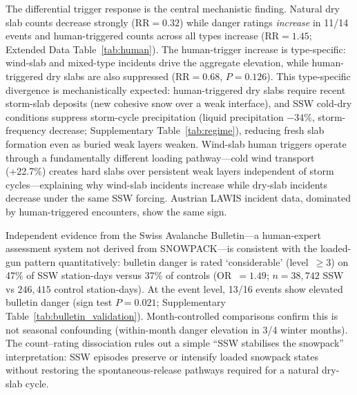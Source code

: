 \documentclass[11pt,letterpaper]{article}
\begin{document}
The differential trigger response is the central mechanistic finding. Natural dry slab counts decrease strongly ($\mathrm{RR} = 0.32$) while danger ratings \emph{increase} in 11/14 events and human-triggered counts across all types increase ($\mathrm{RR} = 1.45$; Extended Data Table~\ref{tab:human}). The human-trigger increase is type-specific: wind-slab and mixed-type incidents drive the aggregate elevation, while human-triggered dry slabs are also suppressed ($\mathrm{RR} = 0.68$, $P = 0.126$). This type-specific divergence is mechanistically expected: human-triggered dry slabs require recent storm-slab deposits (new cohesive snow over a weak interface), and SSW cold-dry conditions suppress storm-cycle precipitation (liquid precipitation $-34\%$, storm-frequency decrease; Supplementary Table~\ref{tab:regime}), reducing fresh slab formation even as buried weak layers weaken. Wind-slab human triggers operate through a fundamentally different loading pathway---cold wind transport (+22.7\%) creates hard slabs over persistent weak layers independent of storm cycles---explaining why wind-slab incidents increase while dry-slab incidents decrease under the same SSW forcing. Austrian LAWIS incident data, dominated by human-triggered encounters, show the same sign.

Independent evidence from the Swiss Avalanche Bulletin---a human-expert assessment system not derived from SNOWPACK---is consistent with the loaded-gun pattern quantitatively: bulletin danger is rated `considerable' (level~$\geq 3$) on 47\% of SSW station-days versus 37\% of controls (OR~$= 1.49$; $n = 38{,}742$ SSW vs $246{,}415$ control station-days). At the event level, 13/16 events show elevated bulletin danger (sign test $P = 0.021$; Supplementary Table~\ref{tab:bulletin_validation}). Month-controlled comparisons confirm this is not seasonal confounding (within-month danger elevation in 3/4 winter months). The count--rating dissociation rules out a simple ``SSW stabilises the snowpack'' interpretation: SSW episodes preserve or intensify loaded snowpack states without restoring the spontaneous-release pathways required for a natural dry-slab cycle.
\end{document}
